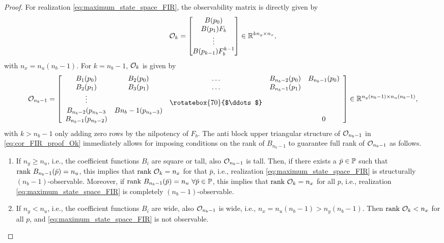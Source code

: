 \begin{proof}
    For realization \eqref{eq:maximum_state_space_FIR}, the observability matrix is directly given by
    \begin{equation}
        \mathcal{O}_k = 
        \begin{bmatrix}
            B(p_0) \\
            B(p_1) F_b \\
            \vdots \\
            B(p_{k-1}) F_b^{k-1}
        \end{bmatrix} \in \mathbb{R}^{k n_y \times n_x},
    \end{equation}
    with $n_x =n_u (n_b-1)$. For $k = n_b-1$, $\mathcal{O}_k$ is given by
    \begin{equation}\label{eq:cor_FIR_proof_Ok}
        \Ocal_{n_b-1} = 
        \left[\begin{array}{ccccc}
            B_1(p_0) & B_2(p_0) & \hdots & B_{n_b-2}(p_0) & B_{n_b-1}(p_0) \\
            B_2(p_1) & B_3(p_1) & \hdots & B_{n_b-1}(p_1) &  \\
            \vdots & & \raisebox{-3pt}{\rotatebox{70}{$\ddots$}} & & \\
            B_{n_b-2}(p_{n_b-3} & B{n_b-1}(p_{n_b-3}) & & & \\
            B_{n_b-1}(p_{n_b-2}) & & & & 0 \end{array}\right] \in \Ree^{n_y (n_b-1) \times n_u (n_b-1)},
    \end{equation}
    with $k > n_b-1$ only adding zero rows by the nilpotency of $F_b$. The anti block upper triangular structure of $\mathcal{O}_{n_b-1}$ in \eqref{eq:cor_FIR_proof_Ok} immediately allows for imposing conditions on the rank of $B_{n_b-1}$ to guarantee full rank of $\mathcal{O}_{n_b-1}$ as follows.
    \begin{enumerate}[leftmargin=*]
        \item If $n_y \geq n_u$, i.e., the coefficient functions $B_i$ are square or tall, also $\mathcal{O}_{n_b-1}$ is tall. Then, if there exists a $\bar{p}\in\mathbb{P}$ such that $\textrm{rank}\ B_{n_b-1}(\bar{p}) = n_u$, this implies that $\textrm{rank}\ \mathcal{O}_k = n_x$ for that $\bar{p}$, i.e., realization  \eqref{eq:maximum_state_space_FIR} is structurally $(n_b-1)$-observable. Moreover, if $\textrm{rank}\ B_{n_b-1}(\bar{p}) = n_u \ \forall \bar{p}\in\mathbb{P}$, this implies that  $\textrm{rank}\ \mathcal{O}_k = n_x$ for all $p$, i.e., realization \eqref{eq:maximum_state_space_FIR} is completely $(n_b-1)$-observable.
        \item  If $n_y < n_u$, i.e., the coefficient functions $B_i$ are wide, also $\mathcal{O}_{n_b-1}$ is wide, i.e., $n_x = n_u (n_b-1) > n_y (n_b-1)$. Then $\textrm{rank}\ \mathcal{O}_k < n_x$ for all $p$, and \eqref{eq:maximum_state_space_FIR} is not observable. \vspace{-20pt}%
    \end{enumerate} %
\end{proof}
